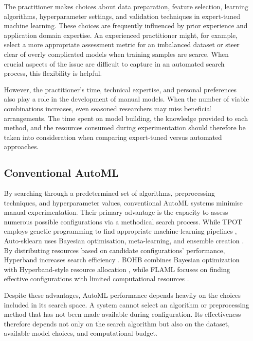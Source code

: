 \documentclass[acmsmall,screen]{acmart}
\begin{document}
The practitioner makes choices about data preparation, feature selection, learning algorithms, hyperparameter settings, and validation techniques in expert-tuned machine learning. These choices are frequently influenced by prior experience and application domain expertise. An experienced practitioner might, for example, select a more appropriate assessment metric for an imbalanced dataset or steer clear of overly complicated models when training samples are scarce. When crucial aspects of the issue are difficult to capture in an automated search process, this flexibility is helpful.

However, the practitioner's time, technical expertise, and personal preferences also play a role in the development of manual models. When the number of viable combinations increases, even seasoned researchers may miss beneficial arrangements. The time spent on model building, the knowledge provided to each method, and the resources consumed during experimentation should therefore be taken into consideration when comparing expert-tuned versus automated approaches.

\subsection{Conventional AutoML}

By searching through a predetermined set of algorithms, preprocessing techniques, and hyperparameter values, conventional AutoML systems minimise manual experimentation. Their primary advantage is the capacity to assess numerous possible configurations via a methodical search process. While TPOT employs genetic programming to find appropriate machine-learning pipelines \cite{olson2016}, Auto-sklearn uses Bayesian optimisation, meta-learning, and ensemble creation \cite{feurer2015}. By distributing resources based on candidate configurations' performance, Hyperband increases search efficiency \cite{li2018}. BOHB combines Bayesian optimization with Hyperband-style resource allocation \cite{falkner2018}, while FLAML focuses on finding effective configurations with limited computational resources \cite{wang2021}.

Despite these advantages, AutoML performance depends heavily on the choices included in its search space. A system cannot select an algorithm or preprocessing method that has not been made available during configuration. Its effectiveness therefore depends not only on the search algorithm but also on the dataset, available model choices, and computational budget.
\end{document}
